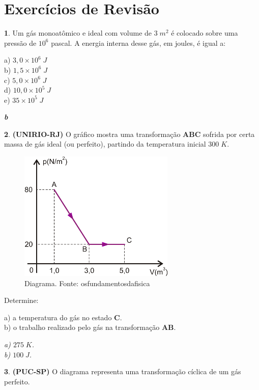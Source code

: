 \documentclass[12pt]{article}
\newenvironment{resposta*}
{\bf Resposta:\\ }
{}
\begin{document}
\hypertarget{x-exercícios-de-revisão}{\section{Exercícios de Revisão}}
\textbf{1}. Um gás monoatômico e ideal com volume de $3\;m^{2}$ é colocado sobre uma pressão de $10^{6}$ pascal. A energia interna desse gás, em joules, é igual a:


a) $3,0\times 10^{6}\;J$ \\
b) $1,5\times 10^{6}\;J$ \\
c) $5,0\times 10^{6}\;J$ \\
d) $10,0\times 10^{5}\;J$ \\
e) $35\times 10^{5}\;J$


\begin{resposta*}
{\it \textbf{b}}
\end{resposta*}

\textbf{2}. \textbf{(UNIRIO-RJ)} O gráfico mostra uma transformação \textbf{ABC} sofrida por certa massa de gás ideal (ou perfeito), partindo da temperatura inicial $300\;K$.


\begin{figure}[h]{}
\centering\includegraphics[width=2.5truein]{img17.png}
\caption{Diagrama. Fonte: osfundamentosdafisica}
\centering
\end{figure}

Determine:


a) a temperatura do gás no estado \textbf{C}. \\
b) o trabalho realizado pelo gás na transformação \textbf{AB}.


\begin{resposta*}
{\it a) $275\;K$. \\
b) $100\;J$.}
\end{resposta*}

\textbf{3}. \textbf{(PUC-SP)} O diagrama representa uma transformação cíclica de um gás perfeito.
\end{document}

